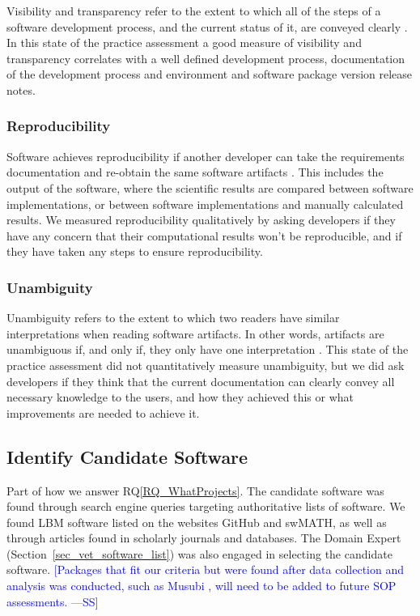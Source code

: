 \documentclass[final, 3p, times, authoryear]{elsarticle}
\newcommand{\authornote}[3]{\textcolor{#1}{[#3 ---#2]}}
\newcommand{\authornote}[3]{}
\newcommand{\wss}[1]{\authornote{blue}{SS}{#1}} %
\newcommand{\rqref}[1]{RQ\ref{#1}}
\begin{document}
Visibility and transparency refer to the extent to which all of the steps of a
software development process, and the current status of it, are conveyed clearly
\citep{ghezzi1991fundamentals}. In this state of the practice assessment a good
measure of visibility and transparency correlates with a well defined
development process, documentation of the development process and environment
and software package version release notes.

\subsubsection{Reproducibility}

Software achieves reproducibility if another developer can take the requirements
documentation and re-obtain the same software artifacts
\citep{BenureauAndRougier2017}. This includes the output of the software, where
the scientific results are compared between software implementations, or between
software implementations and manually calculated results. We measured
reproducibility qualitatively by asking developers if they have any concern that
their computational results won't be reproducible, and if they have taken any
steps to ensure reproducibility.

\subsubsection{Unambiguity}

Unambiguity refers to the extent to which two readers have similar
interpretations when reading software artifacts. In other words, artifacts are
unambiguous if, and only if, they only have one interpretation \citep{IEEE1998}.
This state of the practice assessment did not quantitatively measure
unambiguity, but we did ask developers if they think that the current
documentation can clearly convey all necessary knowledge to the users, and how
they achieved this or what improvements are needed to achieve it.

\subsection{Identify Candidate Software} \label{identifysoftware}

Part of how we answer \rqref{RQ_WhatProjects}.  The candidate software was found
through search engine queries targeting authoritative lists of software. We
found LBM software listed on the websites GitHub and swMATH, as well as through
articles found in scholarly journals and databases.  The Domain Expert
(Section~\ref{sec_vet_software_list}) was also engaged in selecting the
candidate software.  \wss{Packages that fit our criteria but were found after
data collection and analysis was conducted, such as Musubi
\citep{HasertEtAl2014}, will need to be added to future SOP assessments.}
\end{document}
